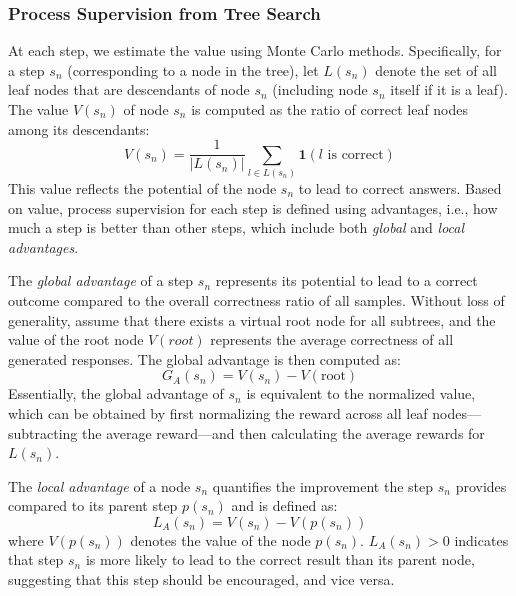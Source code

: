 \subsubsection{Process Supervision from Tree Search}
At each step, we estimate the value using Monte Carlo methods.
Specifically, for a step \( s_n \) (corresponding to a node in the tree), let \( L(s_n) \) denote the set of all leaf nodes that are descendants of node \( s_n \) (including node \( s_n \) itself if it is a leaf). The value \( V(s_n) \) of node \( s_n \) is computed as the ratio of correct leaf nodes among its descendants:
\[
    V(s_n) = \frac{1}{|L(s_n)|} \sum_{l \in L(s_n)} \mathbf{1}(l \text{ is correct})
\]
This value reflects the potential of the node \( s_n \) to lead to correct answers. Based on value, process supervision for each step is defined using advantages, i.e., how much a step is better than other steps, which include both \emph{global} and \emph{local advantages}.

The \emph{global advantage} of a step \( s_n \) represents its potential to lead to a correct outcome compared to the overall correctness ratio of all samples. Without loss of generality, assume that there exists a virtual root node for all subtrees, and the value of the root node $V(root)$ represents the average correctness of all generated responses. The global advantage is then computed as:
\begin{equation}
G_A(s_n) = V(s_n) - V(\text{root})
\label{eq:global_adv}
\end{equation}
Essentially, the global advantage of \(s_n\) is equivalent to the normalized value, which can be obtained by first normalizing the reward across all leaf nodes---subtracting the average reward---and then calculating the average rewards for \(L(s_n)\).

The \emph{local advantage} of a node \( s_n \) quantifies the improvement the step $s_n$ provides compared to its parent step $p(s_n)$
and is defined as:
\begin{equation}
L_A(s_n) = V(s_n) - V(p(s_n))
\label{eq:local_adv}
\end{equation}
where \( V(p(s_n)) \) denotes the value of the node \( p(s_n) \). \( L_A(s_n) > 0 \) indicates that step \( s_n \) is more likely to lead to the correct result than its parent node, suggesting that this step should be encouraged, and vice versa.

